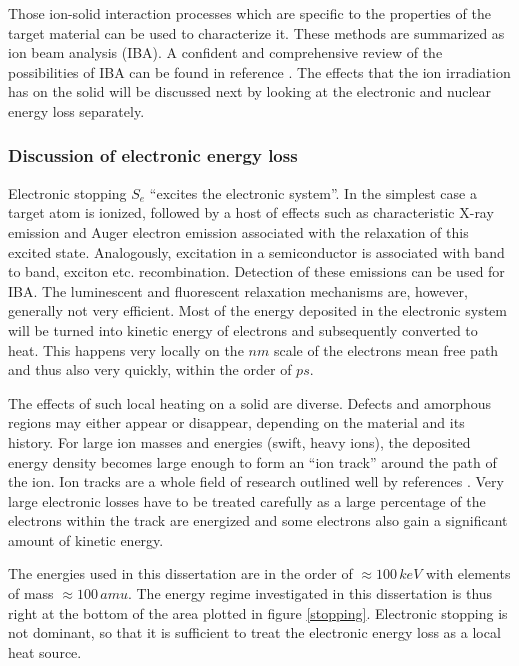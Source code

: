 Those ion-solid interaction processes which are specific to the properties of the target material can be used to characterize it. These methods are summarized as ion beam analysis (IBA). A confident and comprehensive review of the possibilities of IBA can be found in reference \cite{jeynes_total_2012}. The effects that the ion irradiation has on the solid will be discussed next by looking at the electronic and nuclear energy loss separately. 

\subsubsection{Discussion of electronic energy loss}


Electronic stopping $S_e$ ``excites the electronic system''. In the simplest case a target atom is ionized, followed by a host of effects such as characteristic X-ray emission and Auger electron emission associated with the relaxation of this excited state. Analogously, excitation in a semiconductor is associated with band to band, exciton etc. recombination. Detection of these emissions can be used for IBA. The luminescent and fluorescent relaxation mechanisms are, however, generally not very efficient. Most of the energy deposited in the electronic system will be turned into kinetic energy of electrons and subsequently converted to heat. This happens very locally on the $nm$ scale of the electrons mean free path and thus also very quickly, within the order of $ps$. 

The effects of such local heating on a solid are diverse. Defects and amorphous regions may either appear or disappear, depending on the material and its history. For large ion masses and energies (swift, heavy ions), the deposited energy density becomes large enough to form an ``ion track'' around the path of the ion. Ion tracks are a whole field of research outlined well by references \cite{toulemonde_transient_1992,miotello_revisiting_1997,wesch_effect_2004}. Very large electronic losses have to be treated carefully as a large percentage of the electrons within the track are energized and some electrons also gain a significant amount of kinetic energy. 

The energies used in this dissertation are in the order of $\approx 100\,keV$ with elements of mass $\approx 100\,amu$. The energy regime investigated in this dissertation is thus right at the bottom of the area plotted in figure \ref{stopping}. Electronic stopping is not dominant, so that it is sufficient to treat the electronic energy loss as a local heat source.

